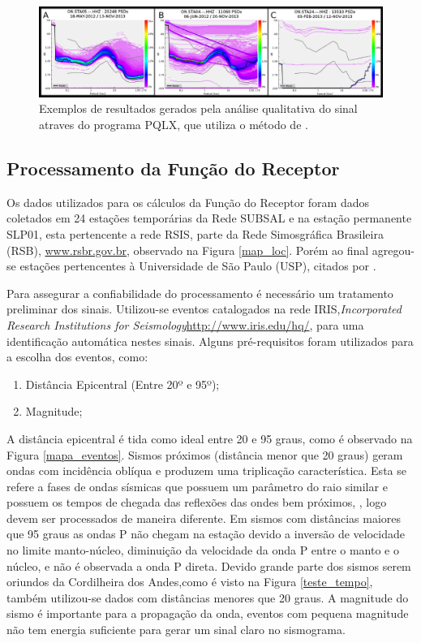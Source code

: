 \begin{figure}[!ht]
\centering
\includegraphics[scale=0.3]{Figs/pqlx_results.png}
\caption{Exemplos de resultados gerados pela análise qualitativa do sinal atraves do programa PQLX, que utiliza o método de \cite{McNamara_Buland_2004}.}
\label{PQLX_results}
\end{figure}

\subsection{Processamento da Função do Receptor}

Os dados utilizados para os cálculos da Função do Receptor foram dados coletados em 24 estações temporárias da Rede SUBSAL e na estação permanente SLP01, esta pertencente a rede RSIS, parte da Rede Simosgráfica Brasileira (RSB), \url{www.rsbr.gov.br}, observado na Figura \ref{map_loc}. Porém ao final agregou-se estações pertencentes à Universidade de São Paulo (USP), citados por \cite{Assumpcao_Brazil_2013}. 

Para assegurar a confiabilidade do processamento é necessário um tratamento preliminar dos sinais. Utilizou-se eventos catalogados na rede IRIS,\textit{Incorporated Research Institutions for Seismology}\url{http://www.iris.edu/hq/}, para uma identificação automática nestes sinais. Alguns pré-requisitos foram utilizados para a escolha dos eventos, como:

\begin{enumerate}
\item Distância Epicentral (Entre 20º e 95º);
\item Magnitude;
\end{enumerate}

A distância epicentral é tida como ideal entre 20 e 95 graus, como é observado na Figura \ref{mapa_eventos}. Sismos próximos (distância menor que 20 graus) geram ondas com incidência oblíqua e produzem uma triplicação característica. Esta se refere a fases de ondas sísmicas que possuem um parâmetro do raio similar e possuem os tempos de chegada das reflexões das ondes bem próximos, \cite{stahler_triplicated_2012}, logo devem ser processados de maneira diferente. Em sismos com distâncias maiores que 95 graus as ondas P não chegam na estação devido a inversão de velocidade no limite manto-núcleo, diminuição da velocidade da onda P entre o manto e o núcleo, e não é observada a onda P direta. Devido grande parte dos sismos serem oriundos da Cordilheira dos Andes,como é visto na Figura \ref{teste_tempo}, também utilizou-se dados com distâncias menores que 20 graus. A magnitude do sismo é importante para a propagação da onda, eventos com pequena magnitude não tem energia suficiente para gerar um sinal claro no sismograma.

